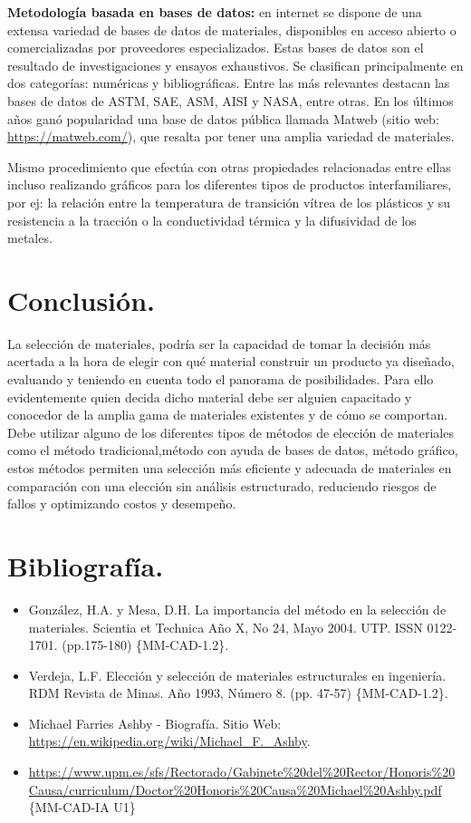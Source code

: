 \documentclass[12pt,a4paper]{article}
\begin{document}
\textbf{Metodología basada en bases de datos:} en internet se dispone de una extensa variedad de bases de datos de materiales, disponibles en acceso abierto o comercializadas por proveedores especializados. Estas bases de datos son el resultado de investigaciones y ensayos exhaustivos. Se clasifican principalmente en dos categorías: numéricas y bibliográficas. Entre las más relevantes destacan las bases de datos de ASTM, SAE, ASM, AISI y NASA, entre otras. En los últimos años ganó popularidad una base de datos pública llamada Matweb (sitio web: \url{https://matweb.com/}), que resalta por tener una amplia variedad de materiales.

Mismo procedimiento que efectúa con otras propiedades relacionadas entre ellas incluso realizando gráficos para los diferentes tipos de productos interfamiliares, por ej: la relación entre la temperatura de transición vítrea de los plásticos y su resistencia a la tracción o la conductividad térmica y la difusividad de los metales.

\section{Conclusión.}

La selección de materiales, podría ser la capacidad de tomar la decisión más acertada a la hora de elegir con qué material construir un producto ya diseñado, evaluando y teniendo en cuenta todo el panorama de posibilidades. Para ello evidentemente quien decida dicho material debe ser alguien capacitado y conocedor de la amplia gama de materiales existentes y de cómo se comportan. Debe utilizar alguno de los diferentes tipos de métodos de elección de materiales como el método tradicional,método con ayuda de bases de datos, método gráfico, estos métodos permiten una selección más eficiente y adecuada de materiales en comparación con una elección sin análisis estructurado, reduciendo riesgos de fallos y optimizando costos y desempeño.

\section{Bibliografía.}
\begin{itemize}
    \item González, H.A. y Mesa, D.H. La importancia del método en la selección de materiales. Scientia et Technica Año X, No 24, Mayo 2004. UTP. ISSN 0122-1701. (pp.175-180) \{MM-CAD-1.2\}.
    \item Verdeja, L.F.  Elección y selección de materiales estructurales en ingeniería. RDM Revista de Minas. Año 1993, Número 8.  (pp. 47-57) \{MM-CAD-1.2\}.
    \item Michael Farries Ashby - Biografía. Sitio Web: \url{https://en.wikipedia.org/wiki/Michael_F._Ashby}.
    \item \url{https://www.upm.es/sfs/Rectorado/Gabinete%20del%20Rector/Honoris%20Causa/curriculum/Doctor%20Honoris%20Causa%20Michael%20Ashby.pdf} \{MM-CAD-IA U1\}
\end{itemize}
\end{document}
